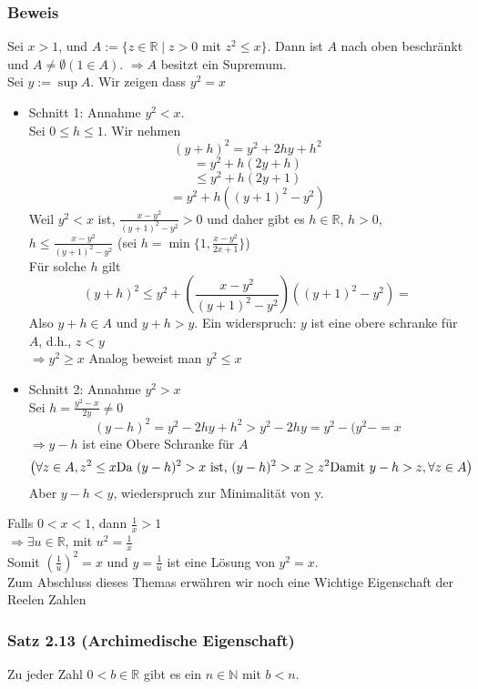 \subsubsection*{Beweis}
Sei $x>1$, und $A:=\{ z\in\mathbb{R}\mid z>0$ mit $z^2\leq x\}$. Dann ist $A$ nach oben beschränkt und $A\not=\emptyset (1\in A)$. $\Rightarrow A$ besitzt ein Supremum. \\
Sei $y:=\sup A$. Wir zeigen dass $y^2=x$
\begin{itemize}
    \item Schnitt 1: Annahme $y^2<x$. \\ 
    Sei $0\leq h\leq 1$.  Wir nehmen $$\left( y+h\right)^2=y^2+2hy+h^2$$
    $$=y^2+h(2y+h)$$
    $$\leq y^2+h(2y+1)$$
    $$=y^2 +h\left( (y+1)^2 -y^2\right)$$
    Weil $y^2<x$ ist, $\frac{x-y^2}{(y+1)^2-y^2}>0$ und daher gibt es $h\in\mathbb{R}$, $h>0$, $h\leq\frac{x-y^2}{(y+1)^2-y^2}$ (sei $h=\min \{1,\frac{x-y^2}{2x+1}\}$)\\
    
    Für solche $h$ gilt $$(y+h)^2\leq y^2 + \left( \frac{x-y^2}{(y+1)^2-y^2}\right)\left( (y+1)^2 -y^2\right)=$$ Also $y+h\in A$ und $y+h>y$. Ein widerspruch: $y$ ist eine obere schranke für $A$, d.h., $z<y$\\$\Rightarrow y^2\geq x$ Analog beweist man $y^2\leq x$
    \item Schnitt 2: Annahme $y^2>x$\\
    Sei $h=\frac{y^2-x}{2y}\not=0$ 
    $$(y-h)^2=y^2-2hy+h^2>y^2-2hy=y^2 -(y^2-=x$$
    $\Rightarrow y-h$ ist eine Obere Schranke für $A$
    $$\left( \forall z \in A, z^2\leq x\text{\newline Da }(y-h)^2>x \text{ ist, } (y-h)^2>x\geq z^2\text{\newline Damit } y-h>z, \forall z \in A\right)$$
    Aber $y-h<y$, wiederspruch zur Minimalität von y.
\end{itemize}
Falls $0<x<1$, dann $\frac{1}{x}>1$\\
$\Rightarrow \exists u\in\mathbb{R}$, mit $u^2=\frac{1}{x}$\\
Somit $\left( \frac{1}{u}\right)^2=x$ und $y=\frac{1}{u}$ ist eine Lösung von $y^2=x$.\\

Zum Abschluss dieses Themas erwähren wir noch eine Wichtige Eigenschaft der Reelen Zahlen

\subsubsection*{Satz 2.13 (Archimedische Eigenschaft)}
Zu jeder Zahl $0<b\in\mathbb{R}$ gibt es ein $n\in\mathbb{N}$ mit $b<n$.
